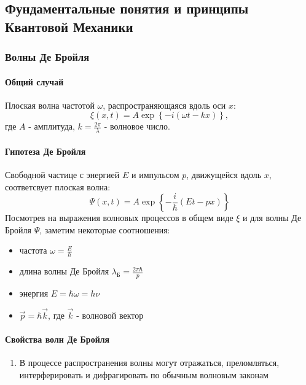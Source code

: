\subsection{Фундаментальные понятия и принципы Квантовой Механики}

\subsubsection{Волны Де Бройля}

\begin{multicols}{2}
	
\paragraph{Общий случай} Плоская волна частотой $\omega$, распространяющаяся вдоль оси $x$:
\begin{equation*}
	\xi(x,t) = A \exp \left\{-i(\omega t -kx)\right\},
\end{equation*}
где $A$ - амплитуда, $k=\frac{2\pi}{\lambda}$ - волновое число.

\paragraph{Гипотеза Де Бройля} 
\thispagestyle{empty}
Свободной частице с энергией $E$ и импульсом $p$, движущейся вдоль $x$, соответсвует плоская волна:
\begin{equation*}
	\Psi(x, t) = A \exp \left\{-\frac{i}{\hbar}(E t - px)\right\}
\end{equation*}
Посмотрев на выражения волновых процессов в общем виде $\xi$ и для волны Де Бройля $\Psi$, заметим некоторые соотношения:
\begin{itemize}
	\item частота $\omega = \frac{E}{\hbar}$
	\item длина волны Де Бройля $\lambda_{\text{Б}}=\frac{2\pi\hbar}{p}$
	\item энергия $E = \hbar \omega = h\nu$
	\item $\vec p = \hbar \vec k$, где $\vec k$ - волновой вектор
\end{itemize}

\paragraph{Свойства волн Де Бройля}
\begin{enumerate}[label=\textbf{№~\arabic{enumi}}]
	\item В процессе распространения волны могут отражаться, преломляться, интерферировать и дифрагировать по обычным волновым законам
	

\end{enumerate}
\end{multicols}
